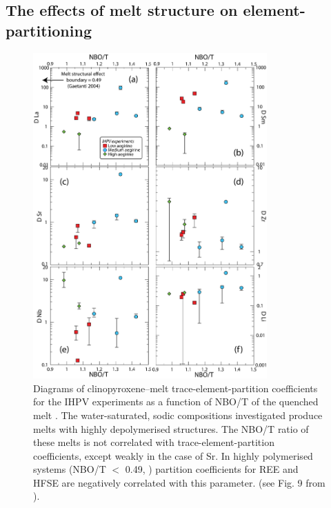 \documentclass[review,authoryear,12pt]{elsarticle}
\begin{document}
\subsection{The effects of melt structure on element-partitioning}


\begin{figure}[tp]
        \begin{center}
        \includegraphics[width=0.8\textwidth]{11_NBO-T_Traces.eps}
        \caption[]{Diagrams of clinopyroxene--melt trace-element-partition coefficients for the IHPV experiments as a function of NBO/T of the quenched melt \citep{Mysen1985}. The water-saturated, sodic compositions investigated produce melts with highly depolymerised structures. The NBO/T ratio of these melts is not correlated with trace-element-partition coefficients, except weakly in the case of Sr. In highly polymerised systems (NBO/T $<$ 0.49, \citealt{Gaetani2004}) partition coefficients for REE and HFSE are negatively correlated with this parameter. (see Fig. 9 from \citealt{Huang2006}).}
        \label{10_1_MeltStructure}
        \end{center}
        \end{figure}
\end{document}
